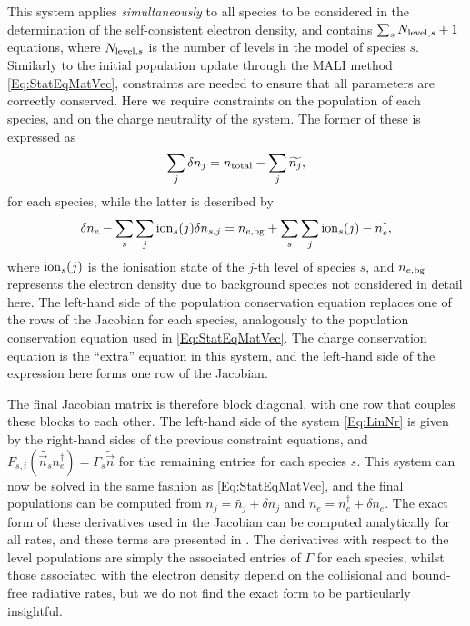 This system applies \emph{simultaneously} to all species to be considered in the determination of the self-consistent electron density, and contains $\sum_s N_{\textnormal{level}, s} + 1$ equations, where $N_{\textnormal{level}, s}$ is the number of levels in the model of species $s$.
Similarly to the initial population update through the MALI method \eqref{Eq:StatEqMatVec}, constraints are needed to ensure that all parameters are correctly conserved.
Here we require constraints on the population of each species, and on the charge neutrality of the system.
The former of these is expressed as
\begin{equation}
    \sum_j \delta n_j = n_\textnormal{total} - \sum_j \widetilde{n_j},
\end{equation}
for each species, while the latter is described by
\begin{equation}
    \delta n_e - \sum_s \sum_j \operatorname{ion}_s(j) \delta n_{s, j} = n_{e, \textnormal{bg}} + \sum_s \sum_j \operatorname{ion}_s(j) - n_e^\dagger,
\end{equation}
where $\operatorname{ion}_s(j)$ is the ionisation state of the $j$-th level of species $s$, and $n_{e, \textnormal{bg}}$ represents the electron density due to background species not considered in detail here.
The left-hand side of the population conservation equation replaces one of the rows of the Jacobian for each species, analogously to the population conservation equation used in \eqref{Eq:StatEqMatVec}.
The charge conservation equation is the ``extra'' equation in this system, and the left-hand side of the expression here forms one row of the Jacobian.

The final Jacobian matrix is therefore block diagonal, with one row that couples these blocks to each other.
The left-hand side of the system \eqref{Eq:LinNr} is given by the right-hand sides of the previous constraint equations, and $F_{s, i}(\widetilde{\vec{n}_s} n_e^\dagger) = \Gamma_s \widetilde{\vec{n}}$ for the remaining entries for each species $s$.
This system can now be solved in the same fashion as \eqref{Eq:StatEqMatVec}, and the final populations can be computed from $n_j = \widetilde{n_j} + \delta n_j$ and $n_e = n_e^\dagger + \delta n_e$.
The exact form of these derivatives used in the Jacobian can be computed analytically for all rates, and these terms are presented in \citet{Osborne2021}.
The derivatives with respect to the level populations are simply the associated entries of $\Gamma$ for each species, whilst those associated with the electron density depend on the collisional and bound-free radiative rates, but we do not find the exact form to be particularly insightful.

